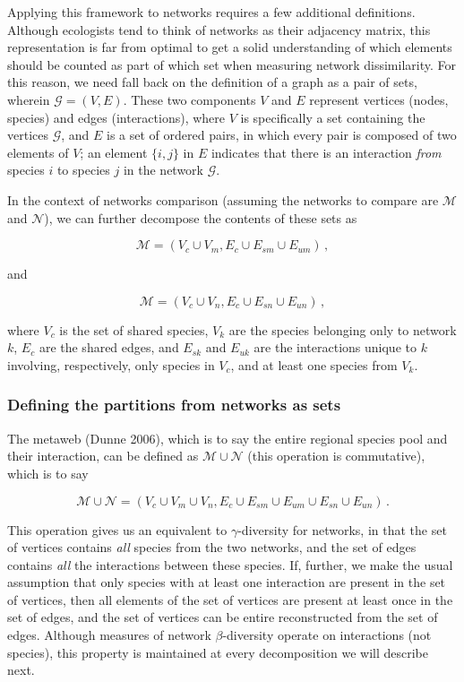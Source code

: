 \documentclass[10pt,oneside]{article}
\begin{document}
Applying this framework to networks requires a few additional
definitions. Although ecologists tend to think of networks as their
adjacency matrix, this representation is far from optimal to get a solid
understanding of which elements should be counted as part of which set
when measuring network dissimilarity. For this reason, we need fall back
on the definition of a graph as a pair of sets, wherein
\(\mathcal{G} = (V, E)\). These two components \(V\) and \(E\) represent
vertices (nodes, species) and edges (interactions), where \(V\) is
specifically a set containing the vertices \(\mathcal{G}\), and \(E\) is
a set of ordered pairs, in which every pair is composed of two elements
of \(V\); an element \(\{i,j\}\) in \(E\) indicates that there is an
interaction \emph{from} species \(i\) to species \(j\) in the network
\(\mathcal{G}\).

In the context of networks comparison (assuming the networks to compare
are \(\mathcal{M}\) and \(\mathcal{N}\)), we can further decompose the
contents of these sets as

\[\mathcal{M} = (V_c \cup V_m, E_c \cup E_{sm} \cup E_{um}) \,,\]

and

\[\mathcal{M} = (V_c \cup V_n, E_c \cup E_{sn} \cup E_{un}) \,,\]

where \(V_c\) is the set of shared species, \(V_k\) are the species
belonging only to network \(k\), \(E_c\) are the shared edges, and
\(E_{sk}\) and \(E_{uk}\) are the interactions unique to \(k\)
involving, respectively, only species in \(V_c\), and at least one
species from \(V_k\).

\hypertarget{defining-the-partitions-from-networks-as-sets}{%
\subsubsection{Defining the partitions from networks as
sets}\label{defining-the-partitions-from-networks-as-sets}}

The metaweb (Dunne 2006), which is to say the entire regional species
pool and their interaction, can be defined as
\(\mathcal{M} \cup \mathcal{N}\) (this operation is commutative), which
is to say

\[\mathcal{M} \cup \mathcal{N} = (V_c \cup V_m \cup V_n, E_c \cup E_{sm} \cup E_{um} \cup E_{sn} \cup E_{un}) \,.\]

This operation gives us an equivalent to \(\gamma\)-diversity for
networks, in that the set of vertices contains \emph{all} species from
the two networks, and the set of edges contains \emph{all} the
interactions between these species. If, further, we make the usual
assumption that only species with at least one interaction are present
in the set of vertices, then all elements of the set of vertices are
present at least once in the set of edges, and the set of vertices can
be entire reconstructed from the set of edges. Although measures of
network \(\beta\)-diversity operate on interactions (not species), this
property is maintained at every decomposition we will describe next.
\end{document}

